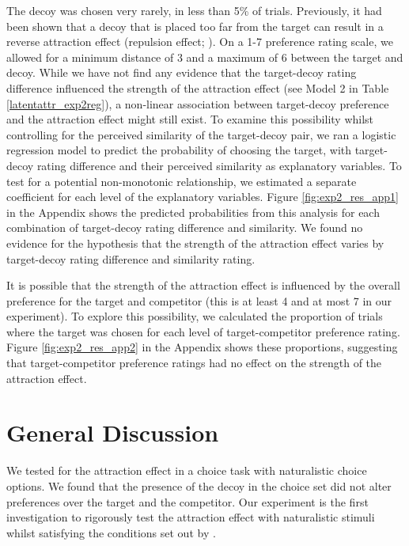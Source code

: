 \documentclass[12pt, a4paper]{article}
\begin{document}
The decoy was chosen very rarely, in less than 5\% of trials. Previously, it had been shown that a decoy that is placed too far from the target can result in a reverse attraction effect (repulsion effect; ). On a 1-7 preference rating scale, we allowed for a minimum distance of 3 and a maximum of 6 between the target and decoy. While we have not find any evidence that the target-decoy rating difference influenced the strength of the attraction effect (see Model 2 in Table \ref{latentattr_exp2reg}), a non-linear association between target-decoy preference and the attraction effect might still exist. To examine this possibility whilst controlling for the perceived similarity of the target-decoy pair, we ran a logistic regression model to predict the probability of choosing the target, with target-decoy rating difference and their perceived similarity as explanatory variables. To test for a potential non-monotonic relationship, we estimated a separate coefficient for each level of the explanatory variables. Figure \ref{fig:exp2_res_app1}  in the Appendix shows the predicted probabilities from this analysis for each combination of target-decoy rating difference and similarity. We found no evidence for the hypothesis that the strength of the attraction effect varies by target-decoy rating difference and similarity rating.

It is possible that the strength of the attraction effect is influenced by the overall preference for the target and competitor (this is at least 4 and at most 7 in our experiment). To explore this possibility, we calculated the proportion of trials where the target was chosen for each level of target-competitor preference rating. Figure \ref{fig:exp2_res_app2} in the Appendix shows these proportions, suggesting that target-competitor preference ratings had no effect on the strength of the attraction effect. 


\section*{General Discussion}

We tested for the attraction effect in a choice task with naturalistic choice options. We found that the presence of the decoy in the choice set did not alter preferences over the target and the competitor. Our experiment is the first investigation to rigorously test the attraction effect with naturalistic stimuli whilst satisfying the conditions set out by .
\end{document}
